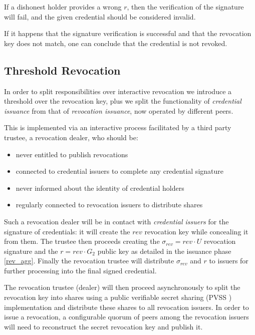 If a dishonest holder provides a wrong $r$, then the verification of
the signature will fail, and the given credential should be considered
invalid.

If it happens that the signature verification is successful and that
the revocation key does not match, one can conclude that the
credential is not revoked.

\subsection{Threshold Revocation}

In order to split responsibilities over interactive revocation we
introduce a threshold over the revocation key, plus we split the
functionality of \textit{credential issuance} from that of
\textit{revocation issuance}, now operated by different peers.

This is implemented via an interactive process facilitated by a third
party trustee, a revocation dealer, who should be:
\begin{itemize}
    \item never entitled to publish revocations
    \item connected to credential issuers to complete any credential
      signature
    \item never informed about the identity of credential holders
    \item regularly connected to revocation issuers to distribute
      shares
\end{itemize}

Such a revocation dealer will be in contact with \textit{credential
  issuers} for the signature of credentials: it will create the $rev$
revocation key while concealing it from them. The trustee then
proceeds creating the $\sigma_{rev} = rev \cdot U$ revocation
signature and the $r = rev \cdot G_2$ public key as detailed in the
issuance phase \eqref{rev_agg}. Finally the revocation trustee will
distribute $\sigma_{rev}$ and $r$ to issuers for further processing
into the final signed credential.

The revocation trustee (dealer) will then proceed asynchronously to
split the revocation key into shares using a public verifiable secret
sharing (PVSS \cite{pvss}) implementation and distribute these shares
to all revocation issuers. In order to issue a revocation, a
configurable quorum of peers among the revocation issuers will need to
reconstruct the secret revocation key and publish it.

